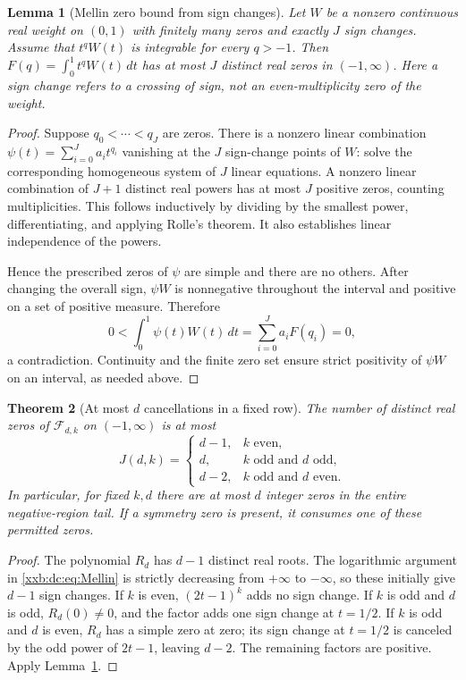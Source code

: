 \documentclass[11pt,a4paper]{article}
\numberwithin{equation}{section}
\newtheorem{theorem}{Theorem}[section]
\newtheorem{lemma}[theorem]{Lemma}
\theoremstyle{definition}
\theoremstyle{remark}
\theoremstyle{plain}
\begin{document}
\begin{lemma}[Mellin zero bound from sign changes]\label{xxb:dc:lem:mellin}
Let $W$ be a nonzero continuous real weight on $(0,1)$ with finitely
many zeros and exactly $J$ sign changes.  Assume that $t^qW(t)$ is
integrable for every $q>-1$.  Then
$F(q)=\int_0^1t^qW(t)\,dt$ has at most $J$ distinct real zeros in
$(-1,\infty)$.  Here a sign change refers to a crossing of sign, not an
even-multiplicity zero of the weight.
\end{lemma}
\begin{proof}
Suppose $q_0<\cdots<q_J$ are zeros.  There is a nonzero linear combination
$\psi(t)=\sum_{i=0}^Ja_it^{q_i}$ vanishing at the $J$ sign-change points of
$W$: solve the corresponding homogeneous system of $J$ linear equations.
A nonzero linear combination of $J+1$ distinct real powers has at most
$J$ positive zeros, counting multiplicities.  This follows inductively by
dividing by the smallest power, differentiating, and applying Rolle's
theorem.  It also establishes linear independence of the powers.

Hence the prescribed zeros of $\psi$ are simple and there are no others.
After changing the overall sign, $\psi W$ is nonnegative throughout the
interval and positive on a set of positive measure.  Therefore
\[
 0<\int_0^1\psi(t)W(t)\,dt=\sum_{i=0}^Ja_iF(q_i)=0,
\]
a contradiction.  Continuity and the finite zero set ensure strict
positivity of $\psi W$ on an interval, as needed above.
\end{proof}

\begin{theorem}[At most $d$ cancellations in a fixed row]\label{xxb:dc:thm:zero-count}
The number of distinct real zeros of $\mathcal F_{d,k}$ on $(-1,\infty)$ is at
most
\begin{equation}\label{xxb:dc:eq:J}
 J(d,k)=
 \begin{cases}
 d-1,&k\text{ even},\\
 d,&k\text{ odd and }d\text{ odd},\\
 d-2,&k\text{ odd and }d\text{ even}.
 \end{cases}
\end{equation}
In particular, for fixed $k,d$ there are at most $d$ integer zeros in the
entire negative-region tail.  If a symmetry zero is present, it consumes
one of these permitted zeros.
\end{theorem}
\begin{proof}
The polynomial $R_d$ has $d-1$ distinct real roots.  The logarithmic
argument in \eqref{xxb:dc:eq:Mellin} is strictly decreasing from $+\infty$ to
$-\infty$, so these initially give $d-1$ sign changes.
If $k$ is even, $(2t-1)^k$ adds no sign change.  If $k$ is odd and $d$ is
odd, $R_d(0)\ne0$, and the factor adds one sign change at $t=1/2$.
If $k$ is odd and $d$ is even, $R_d$ has a simple zero at zero; its sign
change at $t=1/2$ is canceled by the odd power of $2t-1$, leaving $d-2$.
The remaining factors are positive.  Apply Lemma~\ref{xxb:dc:lem:mellin}.
\end{proof}
\end{document}
